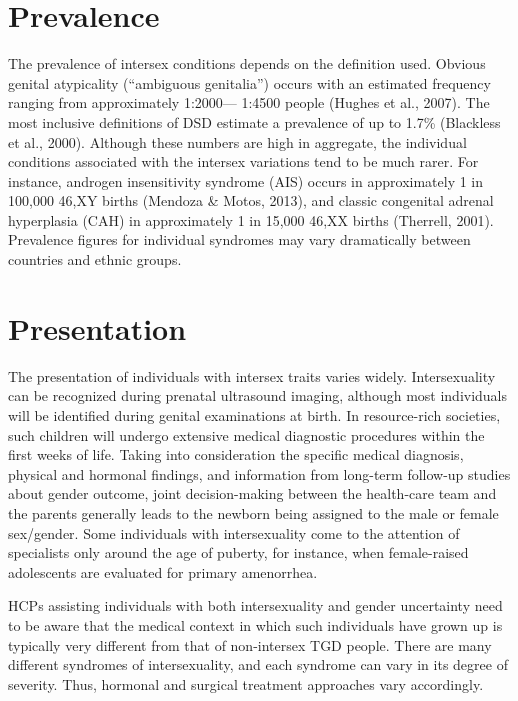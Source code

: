 \documentclass[
]{book}
\begin{document}
\hypertarget{prevalence}{%
\section*{Prevalence}\label{prevalence}}

The prevalence of intersex conditions depends
on the definition used. Obvious genital atypicality
(``ambiguous genitalia'') occurs with an estimated
frequency ranging from approximately 1:2000---
1:4500 people (Hughes et al., 2007). The most
inclusive definitions of DSD estimate a prevalence
of up to 1.7\% (Blackless et al., 2000). Although
these numbers are high in aggregate, the individual conditions associated with the intersex
variations tend to be much rarer. For instance,
androgen insensitivity syndrome (AIS) occurs in
approximately 1 in 100,000 46,XY births (Mendoza
\& Motos, 2013), and classic congenital adrenal
hyperplasia (CAH) in approximately 1 in 15,000
46,XX births (Therrell, 2001). Prevalence figures
for individual syndromes may vary dramatically
between countries and ethnic groups.

\hypertarget{presentation}{%
\section*{Presentation}\label{presentation}}

The presentation of individuals with intersex traits
varies widely. Intersexuality can be recognized
during prenatal ultrasound imaging, although most
individuals will be identified during genital examinations at birth. In resource-rich societies, such
children will undergo extensive medical diagnostic
procedures within the first weeks of life. Taking
into consideration the specific medical diagnosis,
physical and hormonal findings, and information
from long-term follow-up studies about gender
outcome, joint decision-making between the
health-care team and the parents generally leads
to the newborn being assigned to the male or
female sex/gender. Some individuals with intersexuality come to the attention of specialists only
around the age of puberty, for instance, when
female-raised adolescents are evaluated for primary
amenorrhea.

HCPs assisting individuals with both intersexuality and gender uncertainty need to be
aware that the medical context in which such
individuals have grown up is typically very different from that of non-intersex TGD people.
There are many different syndromes of intersexuality, and each syndrome can vary in its
degree of severity. Thus, hormonal and surgical
treatment approaches vary accordingly.
\end{document}
